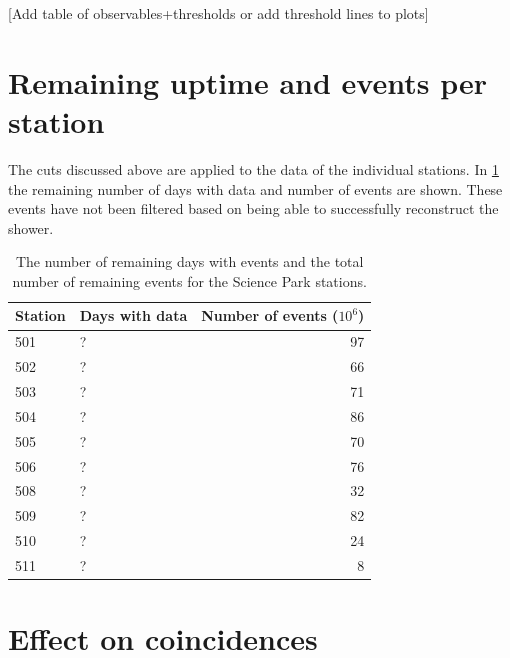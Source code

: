 [Add table of observables+thresholds or add threshold lines to plots]


\section{Remaining uptime and events per station}

The cuts discussed above are applied to the data of the individual stations. In \cref{tab:remaining_events} the remaining number of days with data and number of events are shown. These events have not been filtered based on being able to successfully reconstruct the shower.

\begin{table}
    \centering
    \begin{tabular}{@{}llr@{}}
        \toprule
        Station & Days with data & Number of events ($10^6$) \\
        \midrule
        501     & ?              &                        97 \\
        502     & ?              &                        66 \\
        503     & ?              &                        71 \\
        504     & ?              &                        86 \\
        505     & ?              &                        70 \\
        506     & ?              &                        76 \\
        508     & ?              &                        32 \\
        509     & ?              &                        82 \\
        510     & ?              &                        24 \\
        511     & ?              &                         8 \\
        \bottomrule
    \end{tabular}
    \caption{The number of remaining days with events and the total number of remaining events for the Science Park stations.}
    \label{tab:remaining_events}
\end{table}


\section{Effect on coincidences}


